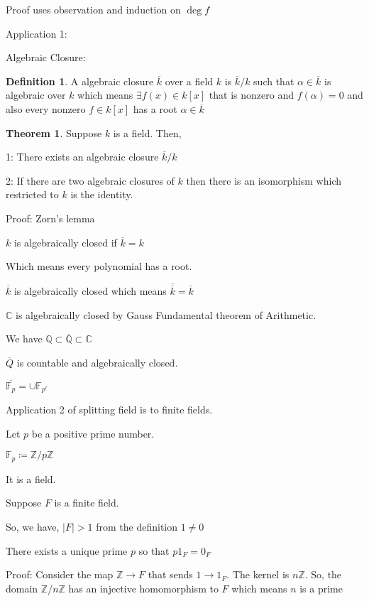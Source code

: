\documentclass{article}
\theoremstyle{definition}
\newtheorem{definition}{Definition}
\newtheorem{theorem}{Theorem}
\begin{document}
Proof uses observation and induction on \(\deg f\)

Application 1:

Algebraic Closure:

\begin{definition}
    A algebraic closure \(\overline{k} \) over a field \(k\) is \(\overline{k} / k\) such that \(\alpha \in \overline{k} \) is algebraic over \(k\) which means \(\exists f(x)\in k[x]\) that is nonzero and \(f(\alpha )=0\) and also every nonzero \(f\in k[x]\) has a root \(\alpha \in \overline{k} \)  
\end{definition}

\begin{theorem}
    Suppose \(k\) is a field. Then,

    1: There exists an algebraic closure \(\overline{k} / k\)
    
    2: If there are two algebraic closures of \(k\) then there is an isomorphism which restricted to \(k\) is the identity.

\end{theorem}

Proof: Zorn's lemma

\(k\) is algebraically closed if \(\overline{k} = k\) 

Which means every polynomial has a root.

\(\overline{k} \) is algebraically closed which means \(\overline{\overline{k} } = \overline{k} \) 

\(\mathbb{C} \) is algebraically closed by Gauss Fundamental theorem of Arithmetic.

We have \(\mathbb{Q}  \subset \overline{\mathbb{Q}} \subset \mathbb{C} \) 

\(\overline{Q} \) is countable and algebraically closed.

\(\overline{\mathbb{F} _p} = \cup \mathbb{F} _{p^r}\) 

Application 2 of splitting field is to finite fields.

Let \(p\) be a positive prime number.

\(\mathbb{F} _p\coloneqq \mathbb{Z} / p\mathbb{Z} \) 

It is a field.

Suppose \(F\) is a finite field.

So, we have, \(\vert F \vert > 1\) from the definition \(1 \neq 0\)

There exists a unique prime \(p\) so that \(p 1_F = 0_F\) 

Proof: Consider the map \(\mathbb{Z} \to F\) that sends \(1\to 1_F\). The kernel is \(n\mathbb{Z} \). So, the domain \(\mathbb{Z} / n\mathbb{Z} \) has an injective homomorphism to \(F\) which means \(n\) is a prime
\end{document}
